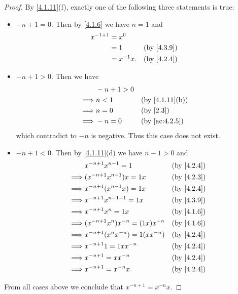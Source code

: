 \begin{proof}
  By \cref{4.1.11}(f), exactly one of the following three statements is true:
  \begin{itemize}
    \item \(-n + 1 = 0\).
          Then by \cref{4.1.6} we have \(n = 1\) and
          \begin{align*}
            x^{-1 + 1} & = x^0                       \\
                       & = 1         &  & \by{4.3.9} \\
                       & = x^{-1} x. &  & \by{4.2.4}
          \end{align*}
    \item \(-n + 1 > 0\).
          Then we have
          \begin{align*}
                     & -n + 1 > 0                                   \\
            \implies & n < 1      &  & \text{(by \cref{4.1.11}(b))} \\
            \implies & n = 0      &  & \by{2.3}                     \\
            \implies & -n = 0     &  & \by{ac:4.2.5}
          \end{align*}
          which contradict to \(-n\) is negative.
          Thus this case does not exist.
    \item \(-n + 1 < 0\).
          Then by \cref{4.1.11}(d) we have \(n - 1 > 0\) and
          \begin{align*}
                     & x^{-n + 1} x^{n - 1} = 1              &  & \by{4.2.4} \\
            \implies & (x^{-n + 1} x^{n - 1}) x = 1x         &  & \by{4.2.3} \\
            \implies & x^{-n + 1} (x^{n - 1} x) = 1x         &  & \by{4.2.4} \\
            \implies & x^{-n + 1} x^{n - 1 + 1} = 1x         &  & \by{4.3.9} \\
            \implies & x^{-n + 1} x^n = 1x                   &  & \by{4.1.6} \\
            \implies & (x^{-n + 1} x^n) x^{-n} = (1x) x^{-n} &  & \by{4.1.6} \\
            \implies & x^{-n + 1} (x^n x^{-n}) = 1(x x^{-n}) &  & \by{4.2.4} \\
            \implies & x^{-n + 1} 1 = 1x x^{-n}              &  & \by{4.2.4} \\
            \implies & x^{-n + 1} = x x^{-n}                 &  & \by{4.2.4} \\
            \implies & x^{-n + 1} = x^{-n} x.                &  & \by{4.2.4}
          \end{align*}
  \end{itemize}
  From all cases above we conclude that \(x^{-n + 1} = x^{-n} x\).
\end{proof}

